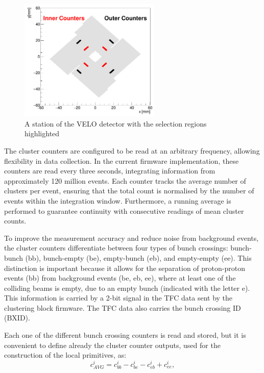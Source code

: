 \begin{figure}
    \centering
    \includegraphics[width=0.6\textwidth]{figures/counters.png}
    \caption{A station of the VELO detector with the selection regions highlighted}
    \label{fig:VELO-counters}
\end{figure}

The cluster counters are configured to be read at an arbitrary frequency, allowing flexibility in data collection. In the current firmware implementation, these counters are read every three seconds, integrating information from approximately 120 million events. 
Each counter tracks the average number of clusters per event, ensuring that the total count is normalised by the number of events within the integration window. Furthermore, a running average is performed to guarantee continuity with consecutive readings of mean cluster counts.

To improve the measurement accuracy and reduce noise from background events, the cluster counters differentiate between four types of bunch crossings: bunch-bunch (bb), bunch-empty (be), empty-bunch (eb), and empty-empty (ee). This distinction is important because it allows for the separation of proton-proton events (bb) from background events (be, eb, ee), where at least one of the colliding beams is empty, due to an empty bunch (indicated with the letter e). This information is carried by a 2-bit signal in the TFC data sent by the clustering block firmware. The TFC data also carries the bunch crossing ID (BXID).

Each one of the different bunch crossing counters is read and stored, but it is convenient to define already the cluster counter outputs, used for the construction of the local primitives, as: 
\begin{equation}
    c^i_{AVG} = c^i_{bb} - c^i_{be} - c^i_{eb} + c^i_{ee},
\end{equation}

